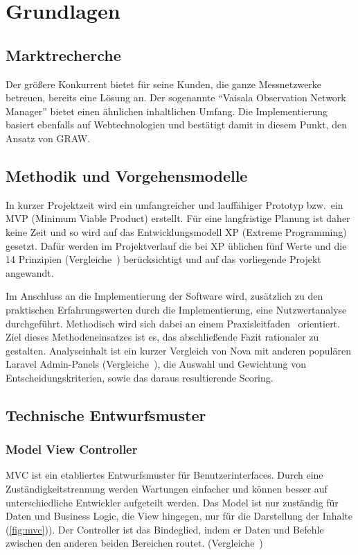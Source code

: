\section{Grundlagen}

\subsection{Marktrecherche}
Der größere Konkurrent bietet für seine Kunden, die ganze Messnetzwerke betreuen, bereits eine Lösung an.
Der sogenannte \enquote{Vaisala Observation Network Manager}\cite{observation-network-manager} bietet einen ähnlichen inhaltlichen Umfang.
Die Implementierung basiert ebenfalls auf Webtechnologien und bestätigt damit in diesem Punkt, den Ansatz von GRAW.

\subsection{Methodik und Vorgehensmodelle}
In kurzer Projektzeit wird ein umfangreicher und lauffähiger Prototyp bzw.\ ein MVP (Minimum Viable Product) erstellt.
Für eine langfristige Planung ist daher keine Zeit und so wird auf das Entwicklungsmodell XP (Extreme Programming) gesetzt.
Dafür werden im Projektverlauf die bei XP üblichen fünf Werte und die 14 Prinzipien (Vergleiche~\cite{agile-prozesse}) berücksichtigt und auf das vorliegende Projekt angewandt.

Im Anschluss an die Implementierung der Software wird, zusätzlich zu den praktischen Erfahrungswerten durch die Implementierung, eine Nutzwertanalyse durchgeführt.
Methodisch wird sich dabei an einem Praxisleitfaden~\cite{scoring-und-nutzwertanalysen} orientiert.
Ziel dieses Methodeneinsatzes ist es, das abschließende Fazit rationaler zu gestalten.
Analyseinhalt ist ein kurzer Vergleich von Nova mit anderen populären Laravel Admin-Panels (Vergleiche~\cite{the-guide-to-laravel-admin-panels}), die Auswahl und Gewichtung von Entscheidungskriterien, sowie das daraus resultierende Scoring.

\subsection{Technische Entwurfsmuster}

\subsubsection{Model View Controller}
MVC ist ein etabliertes Entwurfsmuster für Benutzerinterfaces.
Durch eine Zuständigkeitstrennung werden Wartungen einfacher und können besser auf unterschiedliche Entwickler aufgeteilt werden.
Das Model ist nur zuständig für Daten und Business Logic, die View hingegen, nur für die Darstellung der Inhalte (\ref{fig:mvc})).
Der Controller ist das Bindeglied, indem er Daten und Befehle zwischen den anderen beiden Bereichen routet.
(Vergleiche~\cite{mdn-glossary-mvc})


